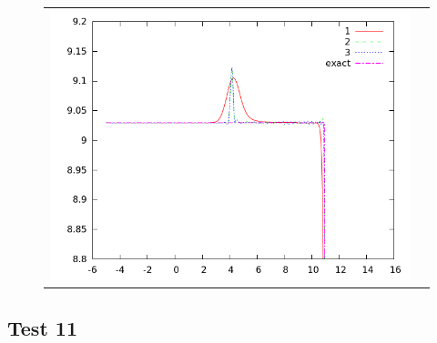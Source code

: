 \documentclass[letterpaper,12pt]{article}
\begin{document}
\begin{figure}[h]
\begin{center}
\begin{tabular}{cc}
      \includegraphics[width=.4\textwidth]{vel10zoom.png} \\
	\end{tabular}	
  \end{center}
  \caption{}
\end{figure}



\clearpage

\subsection{Test 11}
\end{document}
